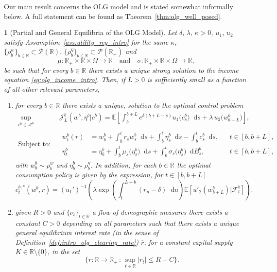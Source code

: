 \documentclass[11pt,oneside,english,reqno,dvipsnames,table]{amsart}
\numberwithin{equation}{section}
\theoremstyle{plain}
\newtheorem{thm}{\protect\theoremname}
\theoremstyle{definition}
\theoremstyle{remark}
\theoremstyle{plain}
\theoremstyle{plain}
\theoremstyle{plain}
\theoremstyle{plain}
\theoremstyle{plain}
\theoremstyle{plain}
\theoremstyle{plain}
\providecommand{\theoremname}{Theorem}
\newcommand{\cF}{\mathcal{F}}
\newcommand{\EE}{\mathbb{E}}
\newcommand{\dd}{\mathop{}\!\mathrm{d}}
\newcommand{\mcA}{\mathcal{A}}
\newcommand{\mcJ}{\mathcal{J}}
\newcommand{\mcP}{\mathcal{P}}
\newcommand{\mbR}{\mathbb{R}}
\numberwithin{thm}{section}
\begin{document}
Our main result concerns the OLG model and is stated somewhat informally below. A full statement can be found as Theorem~\ref{thm:olg_well_posed}.
%
\begin{thm}[Partial and General Equilibria of the OLG Model]
Let $\delta,\, \lambda,\, \kappa >0$, $u_1,\, u_2$ satisfy Assumption~\ref{ass:utility_reg_intro} for the same $\kappa$, $\{\rho^w_b\}_{b\in \mbR}\subset \mcP(\mbR),\, \{\rho^\eta_b\}_{b\in \mbR}\subset \mcP(\mbR_+)$ and 
%
\begin{equation*}
    \mu:\mbR_+\times \mbR \times \Omega \to \mbR \quad \text{and}\quad \sigma:\mbR_+\times \mbR \times \Omega \to \mbR,
\end{equation*}
    be such that for every $b\in \mbR$ there exists a unique strong solution to the income equation \eqref{eq:olg_income_intro}. Then, if $L>0$ is sufficiently small as a function of all other relevant parameters,
    \begin{enumerate}[label=\roman*)]
        \item for every $b\in \mbR$ there exists a unique, solution to the optimal control problem 
        \begin{align}
            \sup_{c^b \in \mcA^b} &\mcJ_L^b(w^b,\eta^b|c^b) = \EE\left[\int_b^{b+L} e^{\delta(b+L- s)}u_1\big(c^b_s\big)\dd s + \lambda \, u_2\big(w^b_{b+L}\big)\right], \label{eq:olg_intro_payoff}\\
%
\text{Subject to:} \qquad &\begin{aligned}
    w^b_t(r) &= w^b_b + \int_b^t r_s w^{b}_s \dd s + \int_b^t \eta^b_s  \dd s - \int_b^t c_s^b \dd s,  &&t\in [b,b+L],
        \\
\eta^b_t &= \eta^b_b +\int_{b}^t \mu_s\big(\eta^b_s\big) \dd s + \int_{b}^t \sigma_s\big(\eta^b_s\big) \dd B^b_s,  &&t\in [b,b+L],
\end{aligned} \label{eq:olg_intro_dynamics}
        \end{align}
with $w^b_b \sim \rho^w_b$ and $\eta^b_b \sim \rho^\eta_b$. In addition, for each $b\in \mbR$ the optimal consumption policy is given by the expression, for $t\in [b,b+L]$
%
\begin{equation}\label{eq:olg_intro_consumption}
    c_t^{b;*}(w^b,r) = (u_1')^{-1}\left(\lambda \exp\left(\int_t^{L+b} (r_u-\delta)\dd u\right)\EE\left[ u'_2\left(w_{b+L}^{b}\right)|\cF_t^b \right]\right).
\end{equation}
        \item given $R>0$ and $\{\nu_t\}_{t\in \mbR}$ a \emph{flow of demographic measures} there exists a constant $C>0$ depending on all parameters such that there exists a unique \emph{general equilibrium interest rate} (in the sense of Definition~\ref{def:intro_olg_clearing_rate}) $\bar{r}$, for a constant capital supply $K \in \mbR\setminus\{0\}$, in the set
        \begin{equation}
            \bigg\{ r:\mbR\to \mbR_+\,:\, \sup_{t\in \mbR}|r_t| \leq R+C
            \bigg\}.
        \end{equation}
    \end{enumerate}
\end{thm}
\end{document}
